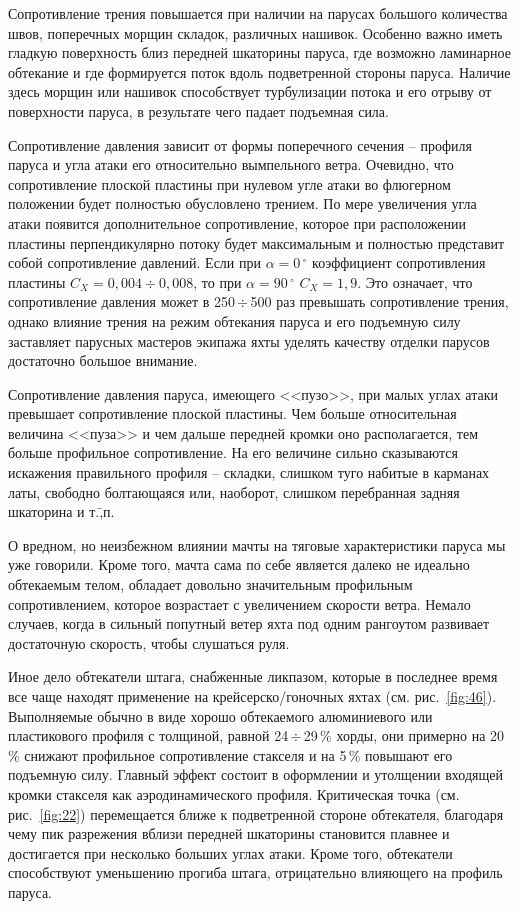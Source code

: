 \documentclass[a4paper, 12pt, twoside, final, book, russian, fittopage, cyremdash]{ncc}
\newcommand{\gr}{\ensuremath{\,^\circ}\xspace}
\newcommand{\otdo}{\,\ensuremath{\div}\,}
\newcommand{\motdo}{\div}
\newcommand{\ris}[1]{\ref{fig:#1}}
\begin{document}
Сопротивление трения повышается при наличии на парусах большого количества швов, поперечных морщин складок, различных нашивок. Особенно важно иметь гладкую поверхность близ передней шкаторины паруса, где возможно ламинарное обтекание и где формируется поток вдоль подветренной стороны паруса. Наличие здесь морщин или нашивок способствует турбулизации потока и его отрыву от поверхности паруса, в результате чего падает подъемная сила. 

Сопротивление давления зависит от формы поперечного сечения \--- профиля паруса и угла атаки его относительно вымпельного ветра. Очевидно, что сопротивление плоской пластины при нулевом угле атаки во флюгерном положении будет полностью обусловлено трением. По мере увеличения угла атаки появится дополнительное сопротивление, которое при расположении пластины перпендикулярно потоку будет максимальным и полностью представит собой сопротивление давлений. Если при $\alpha = 0\gr$ коэффициент сопротивления пластины $C_X = 0,004\motdo 0,008$, то при $\alpha = 90\gr$ $C_X = 1,9$. Это означает, что сопротивление давления может в 250\otdo 500 раз превышать сопротивление трения, однако влияние трения на режим обтекания паруса и его подъемную силу заставляет парусных мастеров экипажа яхты уделять качеству отделки парусов достаточно большое внимание.

Сопротивление давления паруса, имеющего <<пузо>>, при малых углах атаки превышает сопротивление плоской пластины. Чем больше относительная величина <<пуза>> и чем дальше передней кромки оно располагается, тем больше профильное сопротивление. На его величине сильно сказываются искажения правильного профиля \--- складки, слишком туго набитые в карманах латы, свободно болтающаяся или, наоборот, слишком перебранная задняя шкаторина и т.\=,п.
 
О вредном, но неизбежном влиянии мачты на тяговые характеристики паруса мы уже говорили. Кроме того, мачта сама по себе является далеко не идеально обтекаемым телом, обладает довольно значительным профильным сопротивлением, которое возрастает с увеличением скорости ветра. Немало случаев, когда в сильный попутный ветер яхта под одним рангоутом развивает достаточную скорость, чтобы слушаться руля.

Иное дело обтекатели штага, снабженные ликпазом, которые в последнее время все чаще находят применение на крейсерско\-/гоночных яхтах (см. рис.~\ris{46}). Выполняемые обычно в виде хорошо обтекаемого алюминиевого или пластикового профиля с толщиной, равной 24\otdo 29\,\% хорды, они примерно на 20\,\% снижают профильное сопротивление стакселя и на 5\,\% повышают его подъемную силу. Главный эффект состоит в оформлении и утолщении входящей кромки стакселя как аэродинамического профиля. Критическая точка (см. рис.~\ris{22}) перемещается ближе к подветренной стороне обтекателя, благодаря чему пик разрежения вблизи передней шкаторины становится плавнее и достигается при несколько больших углах атаки. Кроме того, обтекатели способствуют уменьшению прогиба штага, отрицательно влияющего на профиль паруса.
\end{document}
